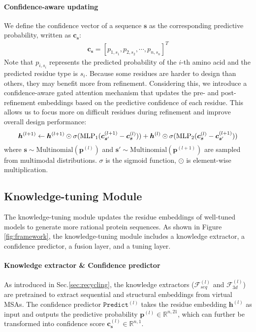 \documentclass{article}
\begin{document}
\paragraph{Confidence-aware updating} We define the confidence vector of a sequence $\boldsymbol{s}$ as the corresponding predictive probability, written as $\boldsymbol{c}_{\boldsymbol{s}}$:
\begin{align}
    \boldsymbol{c}_{\boldsymbol{s}} = [ p_{1, s_1}, p_{2, s_2}, \cdots, p_{n, s_n}  ]^T
\end{align}
Note that $p_{i, s_i}$ represents the predicted probability of the $i$-th amino acid and the predicted residue type is $s_i$. Because some residues are harder to design than others, they may benefit more from refinement. Considering this, we introduce a confidence-aware gated attention mechanism that updates the pre- and post-refinement embeddings based on the predictive confidence of each residue. This allows us to focus more on difficult residues during refinement and improve overall design performance:
\begin{equation}
    \boldsymbol{h}^{(l+1)} \leftarrow \boldsymbol{h}^{(l+1)} \odot \sigma( \text{MLP}_1 (\boldsymbol{c}^{(l+1)}_{\boldsymbol{s}'}-\boldsymbol{c}^{(l)}_{\boldsymbol{s}})) + \boldsymbol{h}^{(l)} \odot \sigma( \text{MLP}_2 (\boldsymbol{c}^{(l)}_{\boldsymbol{s}}-\boldsymbol{c}^{(l+1)}_{\boldsymbol{s}'}))
\end{equation}
where $\boldsymbol{s} \sim \text{Multinomial}(\boldsymbol{p}^{(l)})$ and $\boldsymbol{s}' \sim \text{Multinomial}(\boldsymbol{p}^{(l+1)})$ are sampled from multimodal distributions. $\sigma$ is the sigmoid function, $\odot$ is element-wise multiplication. 




\subsection{Knowledge-tuning Module}
The knowledge-tuning module updates the residue embeddings of well-tuned models to generate more rational protein sequences. As shown in Figure \ref{fig:framework}, the knowledge-tuning module includes a knowledge extractor, a confidence predictor, a fusion layer, and a tuning layer.

\paragraph{Knowledge extractor \& Confidence predictor} As introduced in Sec.\ref{sec:recycling}, the knowledge extractors ($\mathcal{F}_{seq}^{(l)}$ and $\mathcal{F}_{3d}^{(l)}$) are pretrained to extract sequential and structural embeddings from virtual MSAs. The confidence predictor $\texttt{Predict}^{(l)}$ takes the residue embedding $\boldsymbol{h}^{(l)}$ as input and outputs the predictive probability $\boldsymbol{p}^{(l)} \in \mathbb{R}^{n,21}$, which can further be transformed into confidence score $\boldsymbol{c}_{\boldsymbol{s}}^{(l)} \in \mathbb{R}^{n, 1}$.
\end{document}
